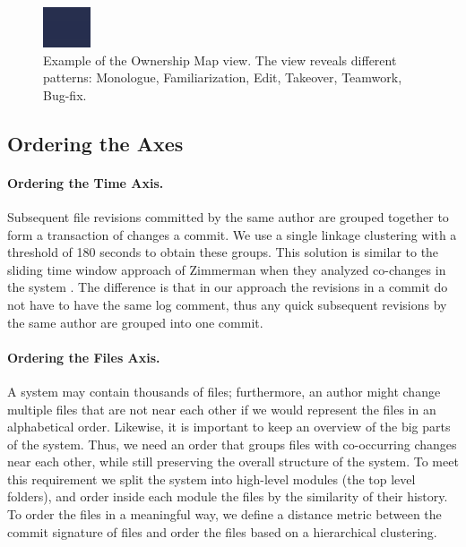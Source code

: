 \documentclass[10pt]{book}
\begin{document}
\begin{figure}[hbt]
\begin{center}
\includegraphics{owners-map-example}
\caption{Example of the Ownership Map view. The view reveals different patterns:
Monologue, Familiarization, Edit, Takeover, Teamwork, Bug-fix.}
\label{fig:ownershipMapExample}
\end{center}
\end{figure}

\subsection{Ordering the Axes}

\paragraph{Ordering the Time Axis.}
Subsequent file revisions committed by the same author are grouped together to form a transaction of changes \ie a commit. We use a single linkage clustering with a threshold of 180 seconds to obtain these groups. This solution is similar to the sliding time window approach of Zimmerman \etal when they analyzed co-changes in the system \cite{Zimm04a}. The difference is that in our approach the revisions in a commit do not have to have the same log comment, thus any quick subsequent revisions by the same author are grouped into one commit.

\paragraph{Ordering the Files Axis.}
A system may contain thousands of files; furthermore, an author might change multiple files that are not near each other if we would represent the files in an alphabetical order. Likewise, it is important to keep an overview of the big parts of the system. Thus, we need an order that groups files with co-occurring changes near each other, while still preserving the overall structure of the system. To meet this requirement we split the system into high-level modules (\eg the top level folders), and order inside each module the files by the similarity of their history. To order the files in a meaningful way, we define a distance metric between the commit signature of files and order the files based on a hierarchical clustering.
\end{document}
